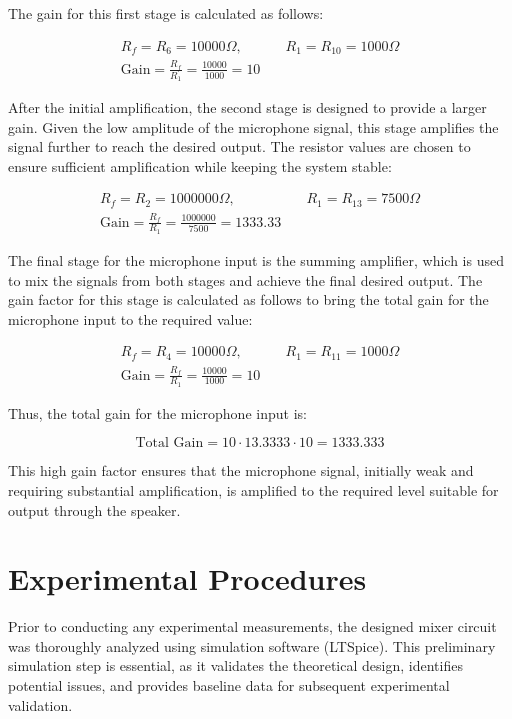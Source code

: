 \documentclass[12pt]{article}
\begin{document}
The gain for this first stage is calculated as follows:

\begin{align*}
	R_f = R_6 = 10000\Omega, \quad & \quad R_1 = R_{10} = 1000\Omega \\
	\text{Gain} = \frac{R_f}{R_1} = \frac{10000}{1000} = 10
\end{align*}

After the initial amplification, the second stage is designed to provide a larger gain. Given the low amplitude of the microphone signal, this stage amplifies the signal further to reach the desired output. The resistor values are chosen to ensure sufficient amplification while keeping the system stable:

\begin{align*}
	R_f = R_2 = 1000000\Omega, \quad & \quad R_1 = R_{13} = 7500\Omega \\
	\text{Gain} = \frac{R_f}{R_1} = \frac{1000000}{7500} = 1333.33
\end{align*}

The final stage for the microphone input is the summing amplifier, which is used to mix the signals from both stages and achieve the final desired output. The gain factor for this stage is calculated as follows to bring the total gain for the microphone input to the required value:

\begin{align*}
	R_f = R_4 = 10000\Omega, \quad & \quad R_1 = R_{11} = 1000\Omega \\
	\text{Gain} = \frac{R_f}{R_1} = \frac{10000}{1000} = 10
\end{align*}

Thus, the total gain for the microphone input is:

\begin{equation}
	\text{Total Gain} = 10 \cdot 13.3333 \cdot 10 = 1333.333
\end{equation}

This high gain factor ensures that the microphone signal, initially weak and requiring substantial amplification, is amplified to the required level suitable for output through the speaker.

\section{Experimental Procedures}
Prior to conducting any experimental measurements, the designed mixer circuit was thoroughly analyzed using simulation software (LTSpice). This preliminary simulation step is essential, as it validates the theoretical design, identifies potential issues, and provides baseline data for subsequent experimental validation.
\end{document}
